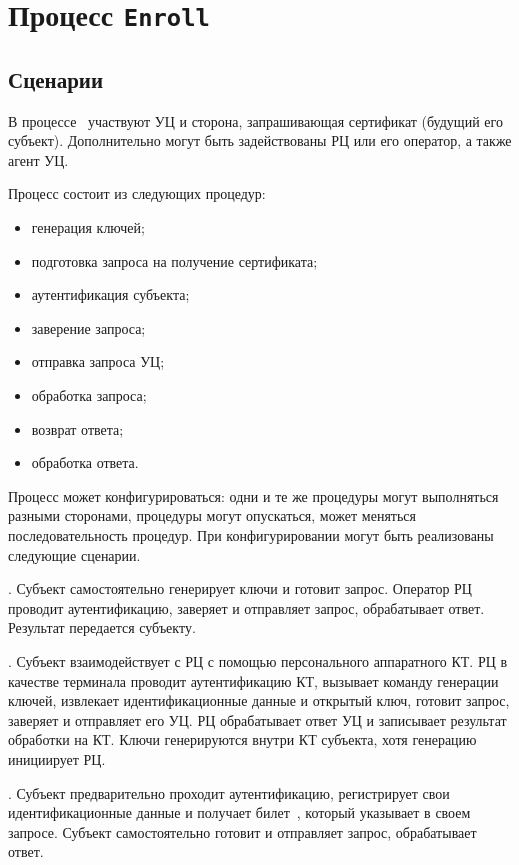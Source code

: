 \section{Процесс \texttt{Enroll}}\label{PROCESSES.Enroll}

\subsection{Сценарии}\label{PROCESSES.Enroll.List}

В процессе~ участвуют УЦ и сторона, запрашивающая сертификат
(будущий его субъект). Дополнительно могут быть задействованы РЦ или его
оператор, а также агент УЦ.

Процесс состоит из следующих процедур:
\begin{itemize}
\item
генерация ключей;
\item
подготовка запроса на получение сертификата;
\item
аутентификация субъекта;
\item
заверение запроса;
\item
отправка запроса УЦ;
\item
обработка запроса;
\item
возврат ответа;
\item
обработка ответа.
\end{itemize}

Процесс может конфигурироваться: одни и те же процедуры могут выполняться
разными сторонами, процедуры могут опускаться, может меняться последовательность
процедур. При конфигурировании могут быть реализованы следующие сценарии.

. 
Субъект самостоятельно генерирует ключи и готовит запрос. Оператор РЦ проводит
аутентификацию, заверяет и отправляет запрос, обрабатывает ответ. Результат
передается субъекту.

. 
Субъект взаимодействует с РЦ с помощью персонального аппаратного КТ. РЦ в 
качестве терминала проводит аутентификацию КТ, вызывает команду генерации 
ключей, извлекает идентификационные данные и открытый ключ, готовит запрос, 
заверяет и отправляет его УЦ. РЦ обрабатывает ответ УЦ и записывает результат 
обработки на КТ. Ключи генерируются внутри КТ субъекта, хотя генерацию 
инициирует РЦ.

.
Субъект предварительно проходит аутентификацию, регистрирует свои
идентификационные данные и получает билет~, который указывает в
своем запросе. Субъект самостоятельно готовит и отправляет запрос, обрабатывает
ответ.

